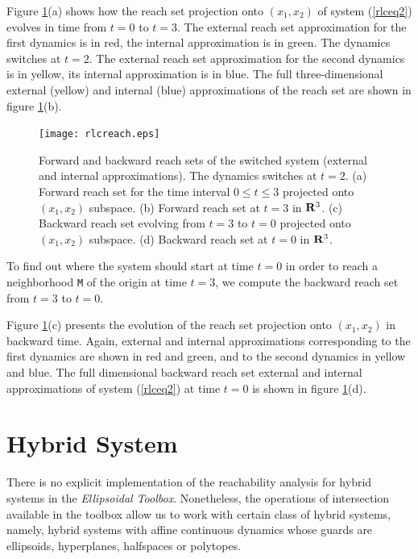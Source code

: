 \documentclass{report}
\begin{document}

Figure \ref{rlcreachfig}(a) shows how the reach set projection
onto $(x_1, x_2)$ of system (\ref{rlceq2})
evolves in time from $t=0$  to $t=3$. The external reach set approximation
for the first dynamics is in red, the internal approximation is in green.
The dynamics switches at $t=2$.
The external reach set approximation for the second dynamics is in yellow,
its internal approximation is in blue.
The full three-dimensional external (yellow) and internal (blue)
approximations of the reach set are shown in figure \ref{rlcreachfig}(b).
\begin{figure}[htbp]
\centerline{
\texttt{[image: rlcreach.eps]}}
\caption{Forward and backward reach sets of the switched system
(external and internal approximations).
The dynamics switches at $t=2$.
\newline
(a) Forward reach set for the time interval $0\leq t\leq3$ projected onto
$(x_1,x_2)$ subspace.
\newline
(b) Forward reach set at $t=3$ in ${\bf R}^3$.
\newline
(c) Backward reach set evolving from $t=3$ to $t=0$ projected onto
$(x_1,x_2)$ subspace.
\newline
(d) Backward reach set at $t=0$ in ${\bf R}^3$.}
\label{rlcreachfig}
\end{figure}

To find out where the system should start at time $t=0$ in order to reach
a neighborhood {\tt M} of the origin at time $t=3$,
we compute the backward reach set from $t=3$ to $t=0$.

Figure \ref{rlcreachfig}(c) presents the evolution of the reach set
projection onto $(x_1, x_2)$ in backward time.
Again, external and internal approximations corresponding
to the first dynamics are shown in red and green, and
to the second dynamics in yellow and blue. The
full dimensional backward reach set external and internal
approximations of system (\ref{rlceq2})
at time $t=0$ is shown in figure \ref{rlcreachfig}(d).



\section{Hybrid System}
There is no explicit implementation of the reachability analysis for hybrid
systems in the {\it Ellipsoidal Toolbox}.
Nonetheless, the operations of intersection available in the toolbox allow us
to work with certain class of hybrid systems, namely,
hybrid systems with affine continuous dynamics whose guards are
ellipsoids, hyperplanes, halfspaces or polytopes.
\end{document}
